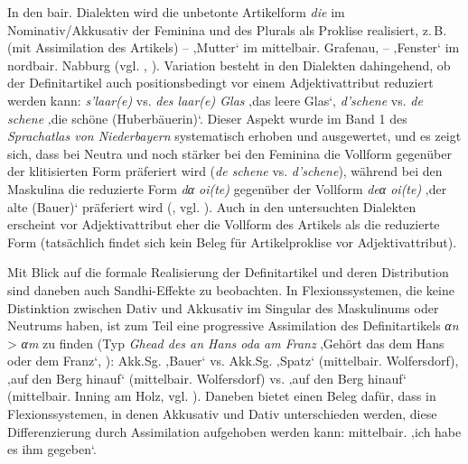 In den bair. Dialekten wird die unbetonte Artikelform \textit{die} im Nominativ/Akkusativ der Feminina und des Plurals als Proklise realisiert, z.\,B. (mit Assimilation des Artikels)  --  ‚Mutter‘ im mittelbair. Grafenau,  --  ‚Fenster‘ im nordbair. Nabburg (vgl. \citealt[112--114 und Karte 18]{Rowley1997}, \citealt[§449]{Schmeller1821}). Variation besteht in den Dialekten dahingehend, ob der Definitartikel auch positionsbedingt vor einem Adjektivattribut reduziert werden kann: \textit{s’laar(e)} vs. \textit{des laar(e) Glas} ‚das leere Glas‘, \textit{d’schene} vs. \textit{de schene} ‚die schöne (Huberbäuerin)‘. Dieser Aspekt wurde im Band 1 des \textit{Sprachatlas von Niederbayern} systematisch erhoben und ausgewertet, und es zeigt sich, dass bei Neutra und noch stärker bei den Feminina die Vollform gegenüber der klitisierten Form präferiert wird (\textit{de schene} vs. \textit{d’schene}), während bei den Maskulina die reduzierte Form \textit{dα oi(te)} gegenüber der Vollform \textit{deα oi(te)} ‚der alte (Bauer)‘ präferiert wird (\citealt[108--130]{SNiB1}, vgl. \citealt[317]{Eroms1989}). Auch in den untersuchten Dialekten erscheint vor Adjektivattribut eher die Vollform des Artikels als die reduzierte Form (tatsächlich findet sich kein Beleg für Artikelproklise vor Adjektiv\-attribut).

Mit Blick auf die formale Realisierung der Definitartikel und deren Distribution sind daneben auch Sandhi-Effekte zu beobachten. In Flexionssystemen, die keine Distinktion zwischen Dativ und Akkusativ im Singular des Maskulinums oder Neutrums haben, ist zum Teil eine progressive Assimilation des Definitartikels \textit{αn} > \textit{αm} zu finden (Typ \textit{Ghead des an Hans oda am Franz} ‚Gehört das dem Hans oder dem Franz‘, \citealt[09]{Zehetner1985}): Akk.Sg.   ‚Bauer‘ vs. Akk.Sg.   ‚Spatz‘ (mittelbair. Wolfersdorf),    ‚auf den Berg hinauf‘ (mittelbair. Wolfersdorf) vs.    ‚auf den Berg hinauf‘ (mittelbair. Inning am Holz, vgl. \citealt[§3d]{Schübel1955}). Daneben bietet \citet[§59]{Freudenberg1959} einen Beleg dafür, dass in Flexionssystemen, in denen Akkusativ und Dativ unterschieden werden, diese Differenzierung durch Assimilation aufgehoben werden kann: mittelbair.    ‚ich habe es ihm gegeben‘.

